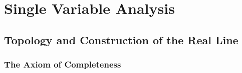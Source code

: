 \documentclass[12pt, a4paper, oneside, openright, titlepage]{book}
\begin{document}
\tableofcontents

\part{Single Variable Analysis}

\chapter{Topology and Construction of the Real Line}

\section{The Axiom of Completeness}
\end{document}
